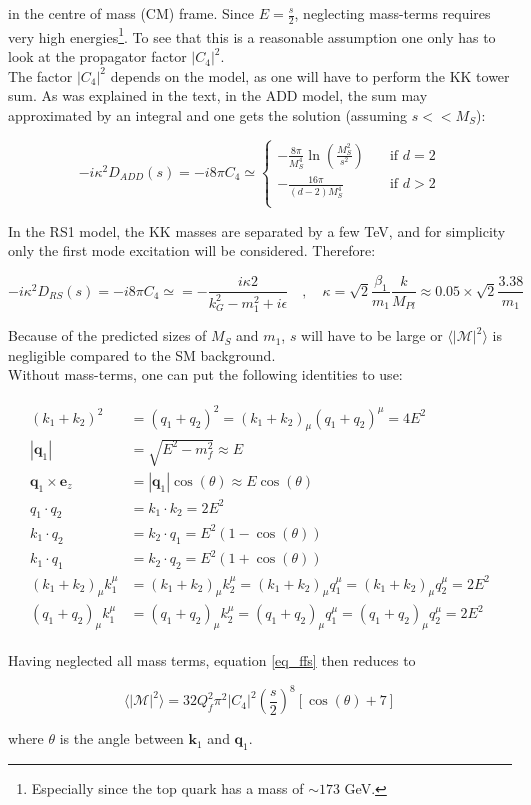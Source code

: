 \documentclass[11pt,a4paper]{article}
\begin{document}
in the centre of mass (CM) frame. Since $E = \frac{s}{2}$, neglecting mass-terms requires very high energies\footnote{Especially since the top quark has a mass of $\sim 173$ GeV.}. To see that this is a reasonable assumption one only has to look at the propagator factor $|C_4|^2$.\\
The factor $|C_4|^2$ depends on the model, as one will have to perform the KK tower sum. As was explained in the text, in the ADD model, the sum may approximated by an integral and one gets the solution (assuming $s<<M_S$):

\begin{equation}
	-i\kappa^2D_{ADD}(s) = -i8\pi C_4\simeq
	\begin{cases}
	-\frac{8\pi}{M_S^4}\ln\left(\frac{M_S^2}{s^2}\right)       & \quad \text{if } d=2\\
	-\frac{16\pi}{(d-2)M_S^4}  & \quad \text{if } d>2\\
	\end{cases}
\end{equation}

In the RS1 model, the KK masses are separated by a few TeV, and for simplicity only the first mode excitation will be considered. Therefore:

\begin{equation}
	-i\kappa^2D_{RS}(s) = -i8\pi C_4\simeq = -\frac{i\kappa 2}{k_G^2 - m_1^2 + i\epsilon}\quad,\quad \kappa = \sqrt{2}\frac{\beta_1}{m_1}\frac{k}{M_{Pl}} \approx 0.05\times\sqrt{2}\frac{3.38}{m_1}
\end{equation}

Because of the predicted sizes of $M_S$ and $m_1$, $s$ will have to be large or $\langle|\mathcal{M}|^2\rangle$ is negligible compared to the SM background.\\
Without mass-terms, one can put the following identities to use:

\begin{align}
	\begin{split}
	(k_1+k_2)^2 &= (q_1 + q_2)^2 = (k_1+k_2)_\mu(q_1+q_2)^\mu = 4E^2\\
	|\bm{q}_1| &= \sqrt{E^2 - m_f^2} \approx E\\
	\bm{q}_1\times \bm{e}_z &= |\bm{q}_1|\cos(\theta) \approx E\cos(\theta)\\
	q_1\cdot q_2 &= k_1\cdot k_2 = 2E^2\\
	k_1\cdot q_2 &= k_2\cdot q_1 = E^2(1-\cos(\theta))\\
	k_1\cdot q_1 &= k_2\cdot q_2 = E^2(1+\cos(\theta))\\
	(k_1+k_2)_\mu k_1^\mu &= (k_1+k_2)_\mu k_2^\mu = (k_1+k_2)_\mu q_1^\mu = (k_1+k_2)_\mu q_2^\mu = 2E^2\\
	(q_1+q_2)_\mu k_1^\mu &= (q_1+q_2)_\mu k_2^\mu = (q_1+q_2)_\mu q_1^\mu = (q_1+q_2)_\mu q_2^\mu = 2E^2
	\end{split}
\end{align}

Having neglected all mass terms, equation \ref{eq_ffs} then reduces to

\begin{equation}
	\langle|\mathcal{M}|^2\rangle = 32Q_f^2\pi^2|C_4|^2 \left(\frac{s}{2}\right)^8\left[\cos(\theta) + 7\right]
\end{equation}

where $\theta$ is the angle between $\bm{k}_1$ and $\bm{q}_1$.
\end{document}
